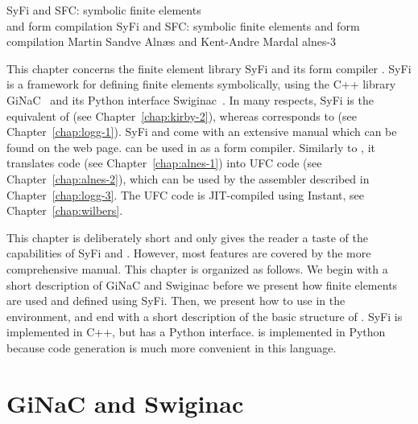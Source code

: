 \begingroup

\setcounter{chapter}{14}
\setcounter{chpnum}{14}

              {SyFi and SFC: symbolic finite elements\\ and form compilation}
              {SyFi and SFC: symbolic finite elements and form compilation}
              {Martin Sandve Aln\ae{}s and Kent-Andre Mardal}
              {alnes-3}

\renewcommand{\AA}{A}
\newcommand{\LL}{L}
\newcommand{\JJ}{J}
\newcommand{\syfi}{SyFi}


This chapter concerns the finite element library \syfi{} and its form
compiler \sfc{}.  \syfi{} is a framework for defining finite elements
symbolically, using the C++ library
GiNaC~\citep{BauerFrinkKreckel2000} and its Python interface
Swiginac~\citep{SkavhaugCertik2009}. In many respects, \syfi{} is the
equivalent of \fiat (see Chapter~\ref{chap:kirby-2}), whereas \sfc{}
corresponds to \ffc{} (see Chapter~\ref{chap:logg-1}). \syfi{}
and \sfc{} come with an extensive manual \citep{AlnaesMardal2009a}
which can be found on the \fenics{} web page. \sfc{} can be used in
\fenics{} as a form compiler. Similarly to \ffc{}, it translates
\ufl{} code (see Chapter~\ref{chap:alnes-1}) into UFC code (see
Chapter~\ref{chap:alnes-2}), which can be used by the \dolfin{}
assembler described in Chapter~\ref{chap:logg-3}. The UFC code is
JIT-compiled using Instant, see Chapter~\ref{chap:wilbers}.

This chapter is deliberately short and only gives the reader a taste
of the capabilities of \syfi{} and \sfc{}. However, most features are
covered by the more comprehensive manual. This chapter is organized as
follows.  We begin with a short description of GiNaC and Swiginac
before we present how finite elements are used and defined
using \syfi{}. Then, we present how to use \sfc{} in the \dolfin{}
environment, and end with a short description of the basic structure
of \sfc{}. \syfi{} is implemented in C++, but has a Python
interface. \sfc{} is implemented in Python because code generation is
much more convenient in this language.

\section{GiNaC and Swiginac}

